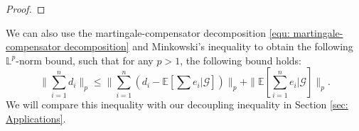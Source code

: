 \documentclass[ECP]{ejpecp} %
\newcommand{\G}{\mathcal{G}}
\newcommand{\lpar}{\left(}
\newcommand{\rpar}{\right)}
\newcommand{\lbr}{\left[}
\newcommand{\rbr}{\right]}
\newcommand{\E}{\mathbb{E}}
\newcommand{\sumn}{\sum\limits_{i=1}^n}
\begin{document}
\begin{proof}
\end{proof}

\begin{remark}
\label{rmk: Lp bound}
    We can also use the martingale-compensator decomposition \eqref{equ: martingale-compensator decomposition} and Minkowski's inequality to obtain the following $\mathbb L^p$-norm bound, such that for any $p>1$, the following bound holds:
    \begin{equation}
        \label{equ: Lp bound}
        \|\sumn d_i \|_p \leq \| \sumn (d_i - \E[\sum e_i|\G]) \|_p + \|\E[\sumn e_i|\G]\|_p.
    \end{equation}
    We will compare this inequality with our decoupling inequality in Section \ref{sec: Applications}.
\end{remark}
\end{document}
